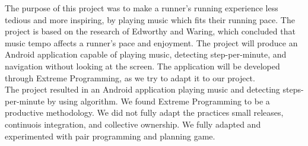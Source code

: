 The purpose of this project was to make a runner's running experience less tedious and more inspiring, by playing music which fits their running pace. 
The project is based on the research of Edworthy and Waring, which concluded that music tempo affects a runner's pace and enjoyment.
The project will produce an Android application capable of playing music, detecting step-per-minute, and navigation without looking at the screen.
The application will be developed through Extreme Programming, as we try to adapt it to our project.\\
The project resulted in an Android application playing music and detecting steps-per-minute by using \citet{zhao:pedometer} algorithm.
We found Extreme Programming to be a productive methodology.
We did not fully adapt the practices small releases, continuois integration, and collective ownership.
We fully adapted and experimented with pair programming and planning game.